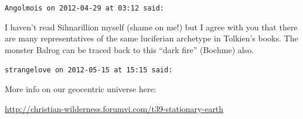 \begin{footnotesize}
\begin{sffamily}
\hfill

\texttt{Angolmois on 2012-04-29 at 03:12 said:}

I haven't read Silmarillion myself (shame on me!) but I agree with you that there are many representatives of the same luciferian archetype in Tolkien's books. The monster Balrog can be traced back to this ``dark fire'' (Boehme) also.

\hfill

\texttt{strangelove on 2012-05-15 at 15:15 said:}

More info on our geocentric universe here:

\url{http://christian-wilderness.forumvi.com/t39-stationary-earth}


\end{sffamily}
\end{footnotesize}

